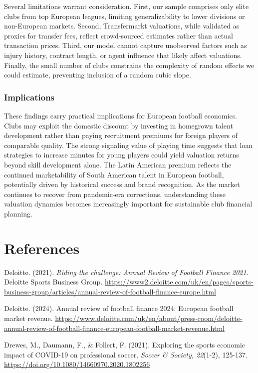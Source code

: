 \documentclass[
  12pt,
]{article}
\begin{document}
Several limitations warrant consideration. First, our sample comprises
only elite clubs from top European leagues, limiting generalizability to
lower divisions or non-European markets. Second, Transfermarkt
valuations, while validated as proxies for transfer fees, reflect
crowd-sourced estimates rather than actual transaction prices. Third,
our model cannot capture unobserved factors such as injury history,
contract length, or agent influence that likely affect valuations.
Finally, the small number of clubs constrains the complexity of random
effects we could estimate, preventing inclusion of a random cubic slope.

\subsubsection{Implications}\label{implications}

These findings carry practical implications for European football
economics. Clubs may exploit the domestic discount by investing in
homegrown talent development rather than paying recruitment premiums for
foreign players of comparable quality. The strong signaling value of
playing time suggests that loan strategies to increase minutes for young
players could yield valuation returns beyond skill development alone.
The Latin American premium reflects the continued marketability of South
American talent in European football, potentially driven by historical
success and brand recognition. As the market continues to recover from
pandemic-era corrections, understanding these valuation dynamics becomes
increasingly important for sustainable club financial planning.

\newpage

\section{References}\label{references}

Deloitte. (2021). \emph{Riding the challenge: Annual Review of Football
Finance 2021}. Deloitte Sports Business Group.
\url{https://www2.deloitte.com/uk/en/pages/sports-business-group/articles/annual-review-of-football-finance-europe.html}

Deloitte. (2024). Annual review of football finance 2024: European
football market revenue.
\url{https://www.deloitte.com/uk/en/about/press-room/deloitte-annual-review-of-football-finance-european-football-market-revenue.html}

Drewes, M., Daumann, F., \& Follert, F. (2021). Exploring the sports
economic impact of COVID-19 on professional soccer. \emph{Soccer \&
Society, 22}(1-2), 125-137.
\url{https://doi.org/10.1080/14660970.2020.1802256}
\end{document}
